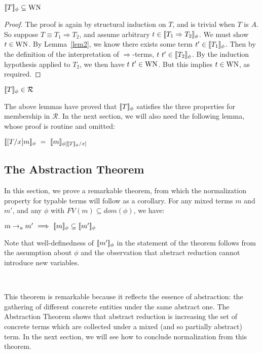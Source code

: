 \documentclass{LMCS}
\newcommand{\To}[0]{\Rightarrow}
\newcommand{\interp}[1]{[\negthinspace[#1]\negthinspace]}
\begin{document}
\begin{lem}
\label{lem3}
$\interp{T}_\phi \subseteq \textnormal{WN}$
\end{lem}

\begin{proof} The proof is again by structural induction on $T$, and is trivial when
$T$ is $A$.  So suppose $T\equiv T_1\To T_2$, and assume arbitrary
$t\in\interp{T_1\To T_2}_\phi$.  We must show $t\in\textnormal{WN}$.
By Lemma~\ref{lem2}, we know there exists some term
$t'\in\interp{T_1}_\phi$.  Then by the definition of the
interpretation of $\To$-terms, $t\ t'\in\interp{T_2}_\phi$.  By the
induction hypothesis applied to $T_2$, we then have
$t\ t'\in\textnormal{WN}$.  But this implies $t\in\textnormal{WN}$, as
required.
\end{proof}

\begin{cor}
$\interp{T}_\phi \in \mathcal{R}$
\end{cor}

\noindent The above lemmas have proved that $\interp{T}_\phi$
satisfies the three properties for membership in $\mathcal{R}$.  In
the next section, we will also need the following lemma, whose proof
is routine and omitted:

\begin{lem}
\label{lem:semsubst}
$\interp{[T/x]m}_\phi\ =\ \interp{m}_{\phi[\interp{T}_\phi/x]}$
\end{lem}

\subsection{The Abstraction Theorem}
\label{sec:abstr}

In this section, we prove a remarkable theorem, from which the
normalization property for typable terms will follow as a corollary.
For any mixed terms $m$ and $m'$, and any $\phi$ with
$\textit{FV}(m)\subseteq\textit{dom}(\phi)$, we have:

\begin{thm}
\label{thm:abstr}
$m\to_a m'\ \Longrightarrow\ \interp{m}_\phi\subseteq\interp{m'}_\phi$
\end{thm}
\noindent Note that well-definedness of $\interp{m'}_\phi$ in the
statement of the theorem follows from the assumption about $\phi$ and
the observation that abstract reduction cannot introduce new
variables.

\

\noindent This theorem is remarkable because it reflects the essence of
abstraction: the gathering of different concrete entities under the
same abstract one.  The Abstraction Theorem shows that abstract
reduction is increasing the set of concrete terms which are collected
under a mixed (and so partially abstract) term.  In the next section,
we will see how to conclude normalization from this theorem.
\end{document}
